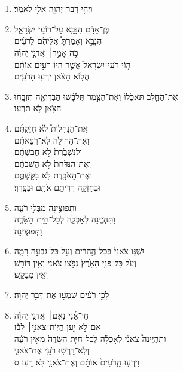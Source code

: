 \documentclass[12pt,a4paper,titlepage]{article}
\def \pslabelsep{-0.9em} %
\def \psleftmargin{0em} %
\begin{document}
\section*{}
\begin{enumerate}[leftmargin=\psleftmargin, labelsep = \pslabelsep, label={\arabic*}, font=\color{\pscolor}\small\textsuperscript, parsep=0em, itemsep=0em, topsep=0em ]
\item \texthebrew{וַיְהִ֥י דְבַר־יְהוָ֖ה אֵלַ֥י לֵאמֹֽר׃}
\item \texthebrew{ בֶּן־אָדָ֕ם הִנָּבֵ֖א עַל־רוֹעֵ֣י יִשְׂרָאֵ֑ל \\ הִנָּבֵ֣א וְאָמַרְתָּ֩ אֲלֵיהֶ֙ם לָרֹעִ֜ים \\ כֹּ֥ה אָמַ֣ר׀ אֲדֹנָ֣י יְהוִ֗ה \\ ה֤וֹי רֹעֵֽי־יִשְׂרָאֵל֙ אֲשֶׁ֤ר הָיוּ֙ רֹעִ֣ים אוֹתָ֔ם \\ הֲל֣וֹא הַצֹּ֔אן יִרְע֖וּ הָרֹעִֽים׃}
\item \texthebrew{אֶת־הַחֵ֤לֶב תֹּאכֵ֙לוּ֙ וְאֶת־הַצֶּ֣מֶר תִּלְבָּ֔שׁוּ הַבְּרִיאָ֖ה תִּזְבָּ֑חוּ \\ הַצֹּ֖אן לֹ֥א תִרְעֽוּ׃}
\item \texthebrew{אֶֽת־הַנַּחְלוֹת֩ לֹ֙א חִזַּקְתֶּ֜ם \\ וְאֶת־הַחוֹלָ֣ה לֹֽא־רִפֵּאתֶ֗ם \\ וְלַנִּשְׁבֶּ֙רֶת֙ לֹ֣א חֲבַשְׁתֶּ֔ם \\ וְאֶת־הַנִּדַּ֙חַת֙ לֹ֣א הֲשֵׁבֹתֶ֔ם \\ וְאֶת־הָאֹבֶ֖דֶת לֹ֣א בִקַּשְׁתֶּ֑ם \\ וּבְחָזְקָ֛ה רְדִיתֶ֥ם אֹתָ֖ם וּבְפָֽרֶךְ׃}
\item \texthebrew{וַתְּפוּצֶ֖ינָה מִבְּלִ֣י רֹעֶ֑ה \\ וַתִּהְיֶ֧ינָה לְאָכְלָ֛ה לְכָל־חַיַּ֥ת הַשָּׂדֶ֖ה \\ וַתְּפוּצֶֽינָה׃}
\item \texthebrew{יִשְׁגּ֤וּ צֹאנִי֙ בְּכָל־הֶ֣הָרִ֔ים וְעַ֖ל כָּל־גִּבְעָ֣ה רָמָ֑ה \\ וְעַ֙ל כָּל־פְּנֵ֤י הָאָ֙רֶץ֙ נָפֹ֣צוּ צֹאנִ֔י וְאֵ֥ין דּוֹרֵ֖שׁ \\ וְאֵ֥ין מְבַקֵּֽשׁ׃}
\item \texthebrew{לָכֵ֣ן רֹעִ֔ים שִׁמְע֖וּ אֶת־דְּבַ֥ר יְהוָֽה׃}
\item \texthebrew{חַי־אָ֜נִי נְאֻ֣ם׀ אֲדֹנָ֣י יְהוִ֗ה \\ אִם־לֹ֣א יַ֣עַן הֱיֽוֹת־צֹאנִ֣י׀ לָבַ֡ז \\ וַתִּֽהְיֶינָה֩ צֹאנִ֙י לְאָכְלָ֜ה לְכָל־חַיַּ֤ת הַשָּׂדֶה֙ מֵאֵ֣ין רֹעֶ֔ה \\ וְלֹֽא־דָרְשׁ֥וּ רֹעַ֖י אֶת־צֹאנִ֑י \\ וַיִּרְע֤וּ הָֽרֹעִים֙ אוֹתָ֔ם וְאֶת־צֹאנִ֖י לֹ֥א רָעֽוּ׃ ס}\parSpace


\end{enumerate}
\end{document}
